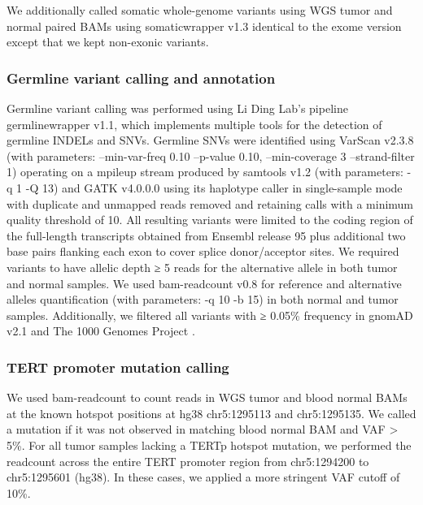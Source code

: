 We additionally called somatic whole-genome variants using WGS tumor and normal paired BAMs using somaticwrapper v1.3 identical to the exome version except that we kept non-exonic variants.

\subsubsection{Germline variant calling and annotation}
Germline variant calling was performed using Li Ding Lab's pipeline germlinewrapper v1.1, which implements multiple tools for the detection of germline INDELs and SNVs. Germline SNVs were identified using VarScan v2.3.8 (with parameters: --min-var-freq 0.10 --p-value 0.10, --min-coverage 3 --strand-filter 1) operating on a mpileup stream produced by samtools v1.2 (with parameters: -q 1 -Q 13) and GATK v4.0.0.0 \cite{mckennaa_depristoma:GenomeAnalysis2010} using its haplotype caller in single-sample mode with duplicate and unmapped reads removed and retaining calls with a minimum quality threshold of 10. All resulting variants were limited to the coding region of the full-length transcripts obtained from Ensembl release 95 plus additional two base pairs flanking each exon to cover splice donor/acceptor sites. We required variants to have allelic depth ≥ 5 reads for the alternative allele in both tumor and normal samples. We used bam-readcount v0.8 for reference and alternative alleles quantification (with parameters: -q 10 -b 15) in both normal and tumor samples. Additionally, we filtered all variants with ≥ 0.05\% frequency in gnomAD v2.1 \cite{karczewskikj_macarthurdg:MutationalConstraint2020} and The 1000 Genomes Project \cite{the1000genomesprojectconsortium:GlobalReference2015}.

\subsubsection{TERT promoter mutation calling}
We used bam-readcount to count reads in WGS tumor and blood normal BAMs at the known hotspot positions at hg38 chr5:1295113 and chr5:1295135. We called a mutation if it was not observed in matching blood normal BAM and VAF > 5\%. For all tumor samples lacking a TERTp hotspot mutation, we performed the readcount across the entire TERT promoter region from chr5:1294200 to chr5:1295601 (hg38). In these cases, we applied a more stringent VAF cutoff of 10\%.


